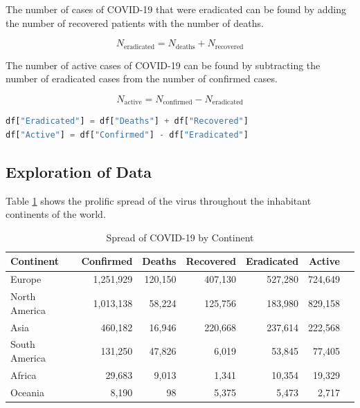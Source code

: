 \documentclass{homework}
\begin{document}
The number of cases of COVID-19 that were eradicated can be found by adding the number of recovered patients with the number of deaths.

\begin{equation}
  N_{\text{eradicated}} = N_{\text{deaths}} + N_{\text{recovered}}
\end{equation}

The number of active cases of COVID-19 can be found by subtracting the number of eradicated cases from the number of confirmed cases.

\begin{equation}
  N_{\text{active}} = N_{\text{confirmed}} - N_{\text{eradicated}}
\end{equation}

\begin{lstlisting}[language=Python, caption={Computed eradicated and active cases}, firstnumber=25]
df["Eradicated"] = df["Deaths"] + df["Recovered"]
df["Active"] = df["Confirmed"] - df["Eradicated"]
\end{lstlisting}

\newpage
\subsection{Exploration of Data}

Table \ref{Continent Spread} shows the prolific spread of the virus throughout the inhabitant continents of the world.

\begin{table}[h]
  \caption{Spread of COVID-19 by Continent}
  \label{Continent Spread}
  \centering
  \begin{tabular}{lrrrrrr}
    \toprule
    Continent     & Confirmed & Deaths & Recovered & Eradicated & Active \\
    \midrule
    Europe        & 1,251,929   & 120,150 & 407,130    & 527,280     & 724,649 \\
    North America & 1,013,138   & 58,224  & 125,756    & 183,980     & 829,158 \\
    Asia          & 460,182    & 16,946  & 220,668    & 237,614     & 222,568 \\
    South America & 131,250    & 47,826  & 6,019      & 53,845      & 77,405  \\
    Africa        & 29,683     & 9,013   & 1,341      & 10,354      & 19,329  \\
    Oceania       & 8,190      & 98     & 5,375      & 5,473       & 2,717   \\
    \bottomrule
  \end{tabular}
\end{table}
\end{document}
